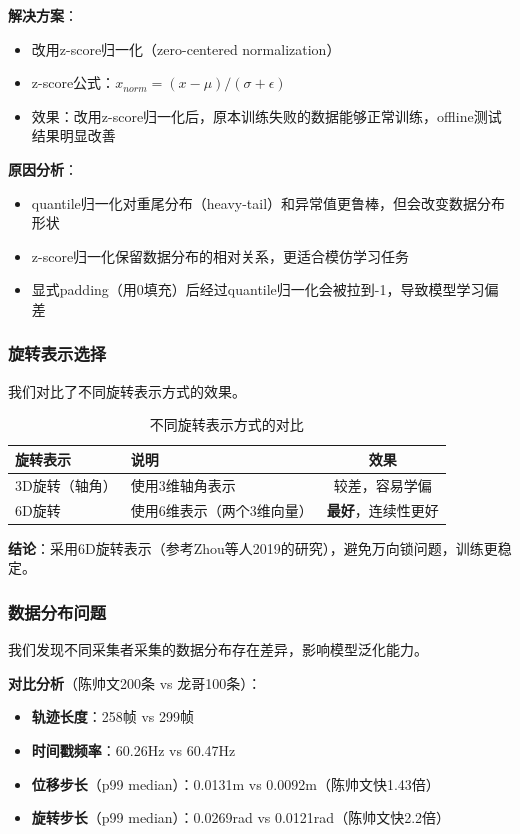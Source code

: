 \textbf{解决方案}：
\begin{itemize}[leftmargin=2em]
    \item 改用z-score归一化（zero-centered normalization）
    \item z-score公式：$x_{norm} = (x - \mu) / (\sigma + \epsilon)$
    \item 效果：改用z-score归一化后，原本训练失败的数据能够正常训练，offline测试结果明显改善
\end{itemize}

\textbf{原因分析}：
\begin{itemize}[leftmargin=2em]
    \item quantile归一化对重尾分布（heavy-tail）和异常值更鲁棒，但会改变数据分布形状
    \item z-score归一化保留数据分布的相对关系，更适合模仿学习任务
    \item 显式padding（用0填充）后经过quantile归一化会被拉到-1，导致模型学习偏差
\end{itemize}

\subsubsection{旋转表示选择}

我们对比了不同旋转表示方式的效果。

\begin{table}[htbp]
\centering
\caption{不同旋转表示方式的对比}
\label{tab:rotation_representation}
\begin{tabular}{llc}
\toprule
旋转表示 & 说明 & 效果 \\
\midrule
3D旋转（轴角） & 使用3维轴角表示 & 较差，容易学偏 \\
6D旋转 & 使用6维表示（两个3维向量） & \textbf{最好}，连续性更好 \\
\bottomrule
\end{tabular}
\end{table}

\textbf{结论}：采用6D旋转表示（参考Zhou等人2019的研究），避免万向锁问题，训练更稳定。

\subsubsection{数据分布问题}

我们发现不同采集者采集的数据分布存在差异，影响模型泛化能力。

\textbf{对比分析}（陈帅文200条 vs 龙哥100条）：
\begin{itemize}[leftmargin=2em]
    \item \textbf{轨迹长度}：258帧 vs 299帧
    \item \textbf{时间戳频率}：60.26Hz vs 60.47Hz
    \item \textbf{位移步长}（p99 median）：0.0131m vs 0.0092m（陈帅文快1.43倍）
    \item \textbf{旋转步长}（p99 median）：0.0269rad vs 0.0121rad（陈帅文快2.2倍）
\end{itemize}

